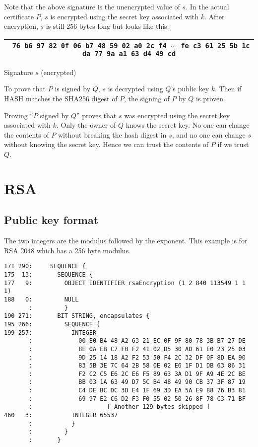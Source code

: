 \documentclass[12pt]{article}
\begin{document}
\bigskip
\noindent
Note that the above signature is the unencrypted value of $s$.
In the actual certificate $P$, $s$ is encrypted using the secret key associated with $k$.
After encryption, $s$ is still 256 bytes long but looks like this:

\begin{center}
\begin{tabular}{|c|}
\hline
{\footnotesize\tt
76 b6 97 82 0f 06 b7 48 59 02 a0 2c f4 $\cdots$
fe c3 61 25 5b 1c da 77 9a a1 63 d4 49 cd}\\
\hline
\end{tabular}

\medskip
Signature $s$ (encrypted)
\end{center}

\noindent
To prove that $P$ is signed by $Q$, $s$ is decrypted using $Q$'s public key $k$.
Then if HASH matches the SHA256 digest of $P$, the signing of $P$ by $Q$ is proven.

\bigskip
\noindent
Proving ``$P$ signed by $Q$'' proves that $s$ was encrypted using the secret key associated with $k$.
Only the owner of $Q$ knows the secret key.
No one can change the contents of $P$ without breaking the hash digest in $s$,
and no one can change $s$ without knowing the secret key.
Hence we can trust the contents of $P$ if we trust $Q$.

\newpage
\section{RSA}

\subsection{Public key format}

\noindent
The two integers are the modulus followed by the exponent.
This example is for RSA 2048 which has a 256 byte modulus.

\begin{verbatim}
171 290:     SEQUENCE {
175  13:       SEQUENCE {
177   9:         OBJECT IDENTIFIER rsaEncryption (1 2 840 113549 1 1 1)
188   0:         NULL
       :         }
190 271:       BIT STRING, encapsulates {
195 266:         SEQUENCE {
199 257:           INTEGER
       :             00 E0 B4 48 A2 63 21 EC 0F 9F 80 78 3B B7 27 DE
       :             8E 0A EB C7 F0 F2 41 02 D5 30 AD 61 E0 23 25 03
       :             9D 25 14 18 A2 F2 53 50 F4 2C 32 DF 0F 8D EA 90
       :             83 5B 3E 7C 64 2B 58 0E 02 E6 1F D1 DB 63 86 31
       :             F2 C2 C5 E6 2C E6 F5 89 63 3A D1 9F A9 4E 2C BE
       :             BB 03 1A 63 49 D7 5C B4 48 49 90 CB 37 3F 87 19
       :             C4 DE BC DC 3D E4 1F 69 3D EA 5A E9 88 76 B3 81
       :             69 97 E2 C6 D2 F3 F0 55 02 50 26 8F 78 C3 71 BF
       :                     [ Another 129 bytes skipped ]
460   3:           INTEGER 65537
       :           }
       :         }
       :       }
\end{verbatim}
\end{document}
